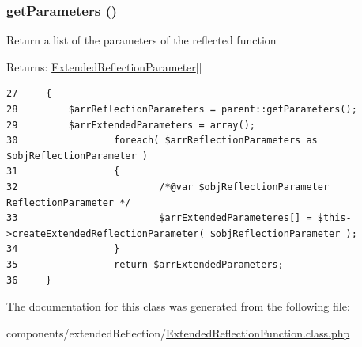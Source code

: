 \hypertarget{class_extended_reflection_function_015cb52e5774a1972d296c9694d2a3c3}{
\subsubsection[{getParameters}]{\setlength{\rightskip}{0pt plus 5cm}getParameters ()}}
\label{class_extended_reflection_function_015cb52e5774a1972d296c9694d2a3c3}


Return a list of the parameters of the reflected function

\begin{Desc}
\item[Returns:]\hyperlink{class_extended_reflection_parameter}{ExtendedReflectionParameter}\mbox{[}\mbox{]} \end{Desc}


\begin{Code}\begin{verbatim}27     {
28         $arrReflectionParameters = parent::getParameters();
29         $arrExtendedParameters = array();
30                 foreach( $arrReflectionParameters as $objReflectionParameter )
31                 {
32                         /*@var $objReflectionParameter ReflectionParameter */
33                         $arrExtendedParameteres[] = $this->createExtendedReflectionParameter( $objReflectionParameter );
34                 }
35                 return $arrExtendedParameters;
36     }
\end{verbatim}
\end{Code}




The documentation for this class was generated from the following file:\begin{CompactItemize}
\item 
components/extendedReflection/\hyperlink{_extended_reflection_function_8class_8php}{ExtendedReflectionFunction.class.php}\end{CompactItemize}
